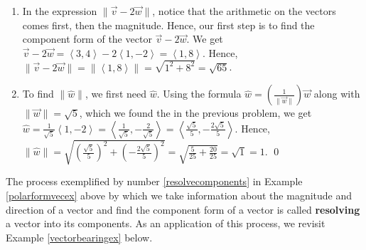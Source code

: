 \begin{ex}
\begin{enumerate}
\begin{enumerate}
\item  In the expression $\| \vec{v} -2\vec{w}\|$, notice that the arithmetic on the vectors comes first, then the magnitude.  Hence, our first step is to find the component form of the vector $\vec{v} - 2\vec{w}$.  We get $\vec{v} - 2 \vec{w} = \left<3,4\right> - 2\left<1,-2\right> = \left<1, 8\right>$.  Hence,  $\| \vec{v} -2\vec{w}\| =  \| \left<1, 8\right>\| = \sqrt{1^2+8^2} = \sqrt{65}$.

\item  To find $\| \hat{w} \|$, we first need $\hat{w}$.  Using the formula  $\hat{w} = \left(\frac{1}{\| \vec{w} \|}\right) \vec{w}$ along with $\| \vec{w} \| = \sqrt{5}$, which we found the in the previous problem, we get  $\hat{w} = \frac{1}{\sqrt{5}} \left<1, -2\right> = \left< \frac{1}{\sqrt{5}}, -\frac{2}{\sqrt{5}}\right>  = \left< \frac{\sqrt{5}}{5}, -\frac{2\sqrt{5}}{5}\right>$.   Hence, $\| \hat{w} \| = \sqrt{\left( \frac{\sqrt{5}}{5}\right)^2 + \left(-\frac{2\sqrt{5}}{5}\right)^2} = \sqrt{\frac{5}{25} + \frac{20}{25}} = \sqrt{1} = 1$. \qed


\end{enumerate}

\end{enumerate}

\end{ex}

The process exemplified by number \ref{resolvecomponents} in Example \ref{polarformvecex} above by which we take information about the magnitude and direction of a vector and find the component form of a vector is called \textbf{resolving} a vector into its components.  As an application of this process, we revisit Example \ref{vectorbearingex} below.


